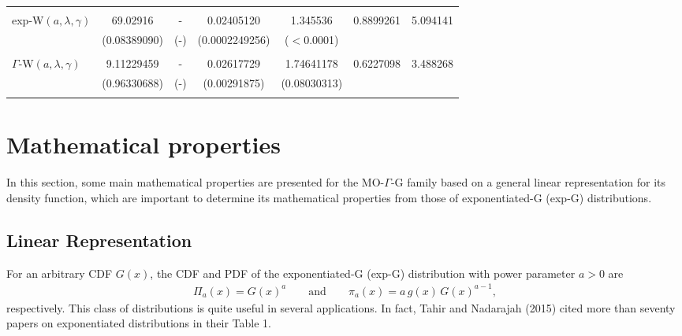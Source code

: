 \documentclass[12pt,a4paper]{article} %
\begin{document}
\begin{table}[htb!]
\begin{tabular}{lcccccc}
 & & & & &  \\
 exp-W$(a,\lambda,\gamma)$   &    69.02916  & - &   0.02405120 & 1.345536 &   0.8899261   & 5.094141 \\
                          &   (0.08389090) & (-) & (0.0002249256) & ($<$0.0001)   &  & \\

 & & & & &  \\
 $\Gamma$-W$(a,\lambda,\gamma)$    & 9.11229459   & - &  0.02617729 & 1.74641178 &    0.6227098 & 3.488268  \\
                             &  (0.96330688)&  (-)&  (0.00291875) & (0.08030313)     &  & \\

 & & & & &  \\




                                                    \hline
\end{tabular}
\end{table}





\section{Mathematical properties}\label{properties}


In this section, some main mathematical properties are presented for the MO-$\Gamma$-G family
based on a general linear representation for its density function, which are important
to determine its mathematical properties from those of exponentiated-G (exp-G) distributions.

\subsection{Linear Representation}


For an arbitrary CDF $G(x)$, the CDF and PDF of the exponentiated-G (exp-G) distribution with power parameter $a>0$ are
\begin{eqnarray*}
\Pi_a(x)=G(x)^a\qquad\text{and}\qquad\pi_a(x)=a\,g(x)\,G(x)^{a-1},
\end{eqnarray*}
respectively. This class of distributions is quite useful in several applications. In fact, Tahir and Nadarajah (2015)
cited more than seventy papers on exponentiated distributions in their Table 1.
\end{document}
